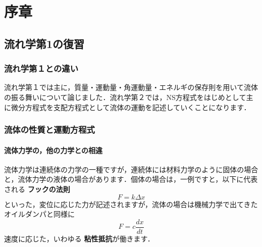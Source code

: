 \documentclass[uplatex,12pt]{jsbook}
\newcommand{\strong}[1]{{\textbf{\color{violet} #1}}}
\begin{document}
	\chapter{序章}
	\section{流れ学第1の復習}
	\subsection{流れ学第１との違い}
	流れ学第１では主に，質量・運動量・角運動量・エネルギの保存則を用いて流体の振る舞いについて論じました．流れ学第２では，NS方程式をはじめとして主に微分方程式を支配方程式として流体の運動を記述していくことになります．
	
	\subsection{流体の性質と運動方程式}
	\subsubsection{流体力学の，他の力学との相違}
	流体力学は連続体の力学の一種ですが，連続体には材料力学のように固体の場合と，流体力学の液体の場合があります．個体の場合は，一例ですと，以下に代表される\strong{フックの法則}
	\begin{equation}
		F = k\Delta x
	\end{equation}
	といった，変位に応じた力が記述されますが，流体の場合は機械力学で出てきたオイルダンパと同様に
	\begin{equation}
	F = c \frac{dx}{dt}
	\end{equation}
	速度に応じた，いわゆる\strong{粘性抵抗}が働きます．
	
\end{document}
